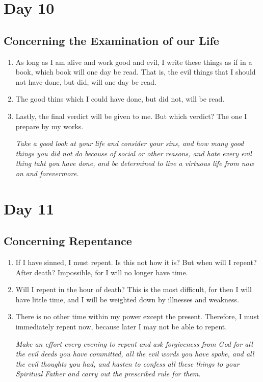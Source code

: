 \documentclass[11pt]{article}
\begin{document}
\section*{Day 10}
\label{sec:orgd443b0d}
\subsection*{Concerning the Examination of our Life}
\label{sec:org0b78907}
\begin{enumerate}
\item As long as I am alive and work good and evil, I write these things as if in a book, which book will one day be read. That is, the evil things that I should not have done, but did, will one day be read.
\item The good thins which I could have done, but did not, will be read.
\item Lastly, the final verdict will be given to me. But which verdict? The one I prepare by my works.

\emph{Take a good look at your life and consider your sins, and how many good things you did not do because of social or other reasons, and hate every evil thing taht you have done, and be determined to live a virtuous life from now on and forevermore.}
\end{enumerate}
\section*{Day 11}
\label{sec:org59edb5c}
\subsection*{Concerning Repentance}
\label{sec:org3b78cd1}
\begin{enumerate}
\item If I have sinned, I must repent. Is this not how it is? But when will I repent? After death? Impossible, for I will no longer have time.
\item Will I repent in the hour of death? This is the most difficult, for then I will have little time, and I will be weighted down by illnesses and weakness.
\item There is no other time within my power except the present. Therefore, I must immediately repent now, because later I may not be able to repent.

\emph{Make an effort every evening to repent and ask forgiveness from God for all the evil deeds you have committed, all the evil words you have spoke, and all the evil thoughts you had, and hasten to confess all these things to your Spiritual Father and carry out the prescribed rule for them.}
\end{enumerate}
\end{document}
